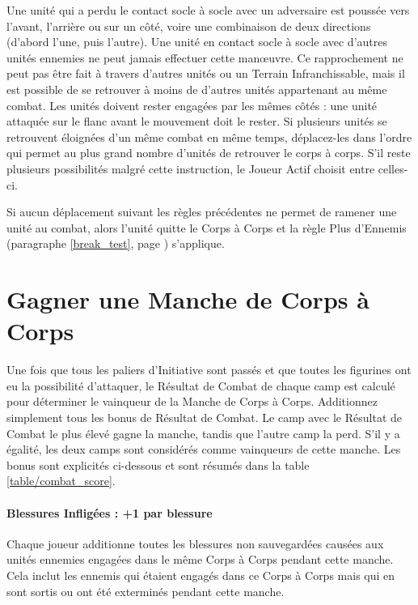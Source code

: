 Une unité qui a perdu le contact socle à socle avec un adversaire est poussée vers l'avant, l'arrière ou sur un côté, voire une combinaison de deux directions (d'abord l'une, puis l'autre). Une unité en contact socle à socle avec d'autres unités ennemies ne peut jamais effectuer cette manœuvre. Ce rapprochement ne peut pas être fait à travers d'autres unités ou un Terrain Infranchissable, mais il est possible de se retrouver à moins de  d'autres unités appartenant au même combat. Les unités doivent rester engagées par les mêmes côtés : une unité attaquée sur le flanc avant le mouvement doit le rester. Si plusieurs unités se retrouvent éloignées d'un même combat en même temps, déplacez-les dans l'ordre qui permet au plus grand nombre d'unités de retrouver le corps à corps. S'il reste plusieurs possibilités malgré cette instruction, le Joueur Actif choisit entre celles-ci.

Si aucun déplacement suivant les règles précédentes ne permet de ramener une unité au combat, alors l'unité quitte le Corps à Corps et la règle Plus d'Ennemis (paragraphe \ref{break_test}, page \pageref{break_test}) s'applique.

\newpage
\section{Gagner une Manche de Corps à Corps}

Une fois que tous les paliers d'Initiative sont passés et que toutes les figurines ont eu la possibilité d'attaquer, le Résultat de Combat de chaque camp est calculé pour déterminer le vainqueur de la Manche de Corps à Corps. Additionnez simplement tous les bonus de Résultat de Combat. Le camp avec le Résultat de Combat le plus élevé gagne la manche, tandis que l'autre camp la perd. S'il y a égalité, les deux camps sont considérés comme vainqueurs de cette manche. Les bonus sont explicités ci-dessous et sont résumés dans la table \ref{table/combat_score}.

\paragraph{Blessures Infligées : +1 par blessure}

Chaque joueur additionne toutes les blessures non sauvegardées causées aux unités ennemies engagées dans le même Corps à Corps pendant cette manche. Cela inclut les ennemis qui étaient engagés dans ce Corps à Corps mais qui en sont sortis ou ont été exterminés pendant cette manche.

